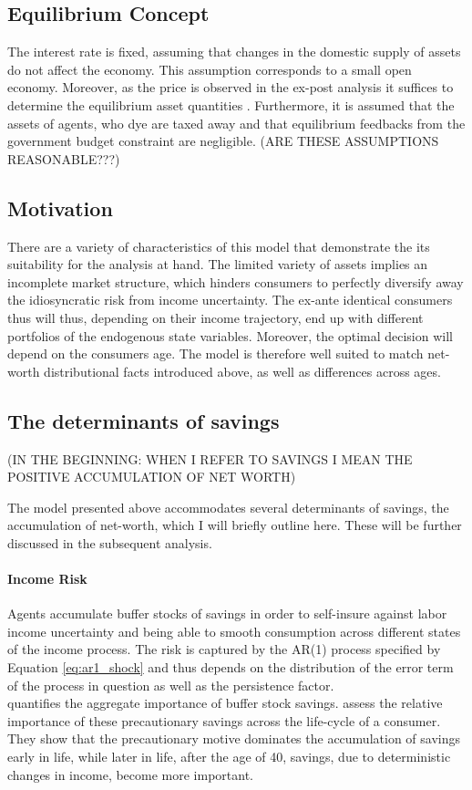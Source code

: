 \documentclass[a4paper,12pt,legno]{article}
\begin{document}
\subsection{Equilibrium Concept}
The interest rate is fixed, assuming that changes in the domestic supply of assets do not affect the economy. This assumption corresponds to a small open economy. Moreover, as the price is observed in the ex-post analysis it suffices to determine the equilibrium asset quantities \citep{hintermaier2011}. Furthermore, it is assumed that the assets of agents, who dye are taxed away and that equilibrium feedbacks from the government budget constraint are negligible. (ARE THESE ASSUMPTIONS REASONABLE???)  

\subsection{Motivation}
There are a variety of characteristics of this model that demonstrate the its suitability for the analysis at hand. The limited variety of assets implies an incomplete market structure, which hinders consumers to perfectly diversify away the idiosyncratic risk from income uncertainty. The ex-ante identical consumers thus will thus, depending on their income trajectory, end up with different portfolios of the endogenous state variables. Moreover, the optimal decision will depend on the consumers age. The model is therefore well suited to match  net-worth distributional facts  introduced above, as well as differences across ages.

\subsection{The determinants of savings}
\label{determinants}
(IN THE BEGINNING: WHEN I REFER TO SAVINGS I MEAN THE POSITIVE ACCUMULATION OF NET WORTH)

The model presented above accommodates several determinants of savings, the accumulation of net-worth, which I will briefly outline here. These will be further discussed in the subsequent analysis. 


\paragraph{Income Risk} Agents accumulate buffer stocks of savings in order to self-insure against labor income uncertainty and being able to smooth consumption across different states of the income process. The risk is captured by the AR(1) process specified by Equation \ref{eq:ar1_shock} and thus depends on the distribution of the error term of the process in question as well as the persistence factor. \\
\cite{aiyagari1994} quantifies the aggregate importance of buffer stock savings. \citep{Gourinchas&Parker2002} assess the relative importance of these precautionary savings across the life-cycle of a consumer. They show that the precautionary motive dominates the accumulation of savings early in life, while later in life, after the age of 40, savings, due to deterministic changes in income, become more important. 
\end{document}
